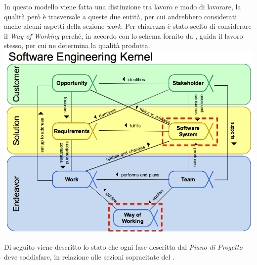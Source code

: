 	In questo modello viene fatta una distinzione tra lavoro e modo di lavorare, la qualità però è trasversale a queste due entità, per cui andrebbero considerati  anche alcuni aspetti della sezione \emph{work}. Per chiarezza è stato scelto di considerare il \emph{Way of Working} perché, in accordo con lo schema fornito da , guida il lavoro stesso, per cui ne determina la qualità prodotta. \\
		
   { \centering \includegraphics[width=1\textwidth]{Semat.png} \\}
   
   Di seguito viene descritto lo stato che ogni fase descritta dal \emph{Piano di Progetto} deve soddisfare, in relazione alle sezioni sopracitate del . 
   

